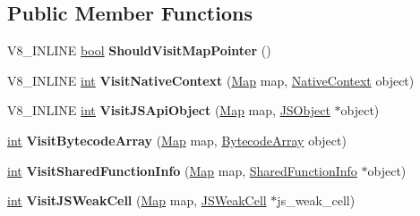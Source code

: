 \subsection*{Public Member Functions}
\begin{DoxyCompactItemize}
\item 
\mbox{\label{classv8_1_1internal_1_1NewSpaceVisitor_ae1c539aa82668c8dac66d3928279cd78}} 
V8\+\_\+\+I\+N\+L\+I\+NE \mbox{\hyperlink{classbool}{bool}} {\bfseries Should\+Visit\+Map\+Pointer} ()
\item 
\mbox{\label{classv8_1_1internal_1_1NewSpaceVisitor_abbe295093261548dbe9b89ee00cdfcd5}} 
V8\+\_\+\+I\+N\+L\+I\+NE \mbox{\hyperlink{classint}{int}} {\bfseries Visit\+Native\+Context} (\mbox{\hyperlink{classv8_1_1internal_1_1Map}{Map}} map, \mbox{\hyperlink{classv8_1_1internal_1_1NativeContext}{Native\+Context}} object)
\item 
\mbox{\label{classv8_1_1internal_1_1NewSpaceVisitor_a172d9b91db47a808b0f83440a2343ece}} 
V8\+\_\+\+I\+N\+L\+I\+NE \mbox{\hyperlink{classint}{int}} {\bfseries Visit\+J\+S\+Api\+Object} (\mbox{\hyperlink{classv8_1_1internal_1_1Map}{Map}} map, \mbox{\hyperlink{classv8_1_1internal_1_1JSObject}{J\+S\+Object}} $\ast$object)
\item 
\mbox{\label{classv8_1_1internal_1_1NewSpaceVisitor_afeb16724c1e428bb3df230723ab00826}} 
\mbox{\hyperlink{classint}{int}} {\bfseries Visit\+Bytecode\+Array} (\mbox{\hyperlink{classv8_1_1internal_1_1Map}{Map}} map, \mbox{\hyperlink{classv8_1_1internal_1_1BytecodeArray}{Bytecode\+Array}} object)
\item 
\mbox{\label{classv8_1_1internal_1_1NewSpaceVisitor_a11094de047d5461367a6a20a5e18aea4}} 
\mbox{\hyperlink{classint}{int}} {\bfseries Visit\+Shared\+Function\+Info} (\mbox{\hyperlink{classv8_1_1internal_1_1Map}{Map}} map, \mbox{\hyperlink{classv8_1_1internal_1_1SharedFunctionInfo}{Shared\+Function\+Info}} $\ast$object)
\item 
\mbox{\label{classv8_1_1internal_1_1NewSpaceVisitor_ad0f6f120369440b78d657987a2c2b8fc}} 
\mbox{\hyperlink{classint}{int}} {\bfseries Visit\+J\+S\+Weak\+Cell} (\mbox{\hyperlink{classv8_1_1internal_1_1Map}{Map}} map, \mbox{\hyperlink{classv8_1_1internal_1_1JSWeakCell}{J\+S\+Weak\+Cell}} $\ast$js\+\_\+weak\+\_\+cell)
\end{DoxyCompactItemize}
